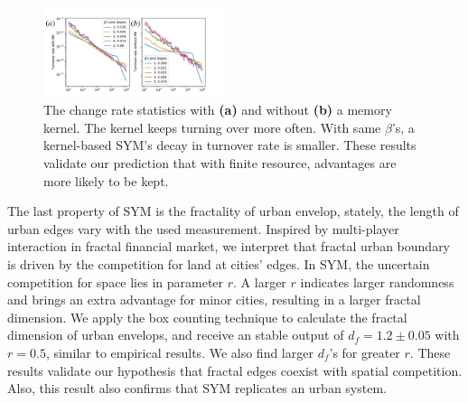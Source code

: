 \documentclass[reprint,unsortedaddress,amsmath,amssymb,aps,prl,showkeys]{revtex4-2}
\begin{document}
\begin{figure}
	\centering
	\includegraphics[width = 0.47\textwidth]{pics/in_one_now_now.pdf}
	\caption{The change rate statistics with \textbf{(a)} and without \textbf{(b)} a memory kernel. The kernel keeps turning over more often. With same $\beta$'s, a kernel-based SYM's decay in turnover rate is smaller. These results validate our prediction that with finite resource, advantages are more likely to be kept.}
	\label{changerate}
\end{figure}

The last property of SYM is the fractality of urban envelop, stately, the length of urban edges vary with the used measurement. Inspired by multi-player interaction in fractal financial market\cite{PhysRevE.65.037106}, we interpret that fractal urban boundary is driven by the competition for land at cities' edges. In SYM, the uncertain competition for space lies in parameter $r$. A larger $r$ indicates larger randomness and brings an extra advantage for minor cities, resulting in a larger fractal dimension. We apply the box counting technique to calculate the fractal dimension of urban envelops, and receive an stable output of $d_f = 1.2\pm 0.05$ with $r = 0.5$, similar to empirical results\cite{batty1992form}. We also find larger $d_f$'s for greater $r$. These results validate our hypothesis that fractal edges coexist with spatial competition. Also, this result also confirms that SYM replicates an urban system.
\end{document}
